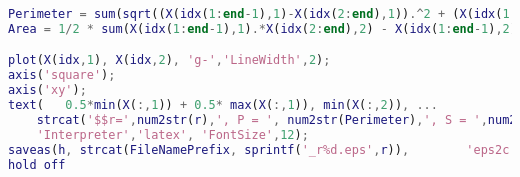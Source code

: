 \begin{lstlisting}[language=matlab, frame=lines]
Perimeter = sum(sqrt((X(idx(1:end-1),1)-X(idx(2:end),1)).^2 + (X(idx(1:end-1),2)-X(idx(2:end),2)).^2) )
Area = 1/2 * sum(X(idx(1:end-1),1).*X(idx(2:end),2) - X(idx(1:end-1),2).*X(idx(2:end),1))

plot(X(idx,1), X(idx,2), 'g-','LineWidth',2);
axis('square');
axis('xy');
text(   0.5*min(X(:,1)) + 0.5* max(X(:,1)), min(X(:,2)), ...
    strcat('$$r=',num2str(r),', P = ', num2str(Perimeter),', S = ',num2str(Area),'$$'), ...
    'Interpreter','latex', 'FontSize',12);
saveas(h, strcat(FileNamePrefix, sprintf('_r%d.eps',r)),        'eps2c');
hold off
\end{lstlisting}

